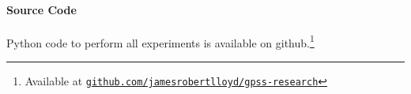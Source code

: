 \documentclass{article} %
\begin{document}
\paragraph{Source Code}
Python code to perform all experiments is available on github.\footnote{Available at 
\href{http://www.github.com/jamesrobertlloyd/gpss-research}
{\texttt{github.com/jamesrobertlloyd/gpss-research}}}








\end{document}
